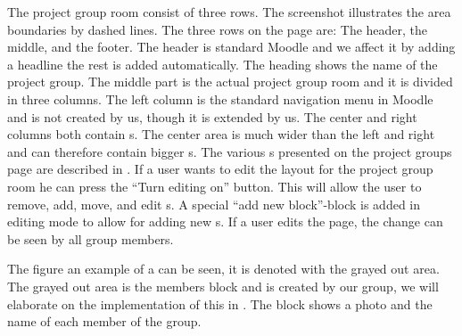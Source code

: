 The project group room consist of three rows.
The screenshot illustrates the area boundaries by dashed lines. 
The three rows on the page are: The header, the middle, and the footer. 
The header is standard Moodle and we affect it by adding a headline the rest is added automatically.
The heading shows the name of the project group. 
The middle part is the actual project group room and it is divided in three columns. 
The left column is the standard navigation menu in Moodle and is not created by us, though it is extended by us.
The center and right columns both contain \block{}s.
The center area is much wider than the left and right and can therefore contain bigger \block{}s. 
The various \block{}s presented on the project groups page are described in . 
If a user wants to edit the layout for the project group room he can press the ``Turn editing on'' button. 
This will allow the user to remove, add, move, and edit \block{}s. 
A special ``add new block''-block is added in editing mode to allow for adding new \block{}s. 
If a user edits the page, the change can be seen by all group members. 

The figure an example of a \block{} can be seen, it is denoted with the grayed out area.
The grayed out area is the members block and is created by our group, we will elaborate on the implementation of this in . 
The block shows a photo and the name of each member of the group. 



